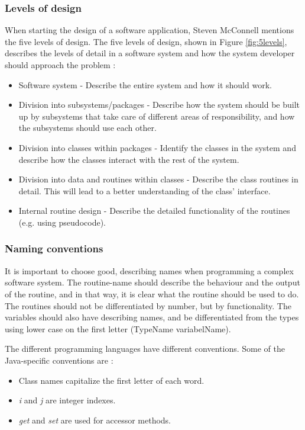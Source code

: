\subsubsection{Levels of design}
\label{sec:levdes}
When starting the design of a software application, Steven McConnell mentions the five levels of design. The five levels of design, shown in Figure \ref{fig:5levels}, describes the levels of detail in a software system and how the system developer should approach the problem \cite{stevemcconnell2004}:
\begin{itemize}
    \item Software system - Describe the entire system and how it should work.
    \item Division into subsystems/packages - Describe how the system should be built up by subsystems that take care of different areas of responsibility, and how the subsystems should use each other.
    \item Division into classes within packages - Identify the classes in the system and describe how the classes interact with the rest of the system.
    \item Division into data and routines within classes - Describe the class routines in detail. This will lead to a better understanding of the class' interface.
    \item Internal routine design - Describe the detailed functionality of the routines (e.g. using pseudocode).
\end{itemize}

\subsubsection{Naming conventions}
\label{sec:nameconv}
It is important to choose good, describing names when programming a complex software system. The routine-name should describe the behaviour and the output of the routine, and in that way, it is clear what the routine should be used to do. The routines should not be differentiated by number, but by functionality. The variables should also have describing names, and be differentiated from the types using lower case on the first letter (TypeName variabelName).

The different programming languages have different conventions. Some of the Java-specific conventions are \cite{stevemcconnell2004}:
\begin{itemize}
    \item Class names capitalize the first letter of each word.
    \item \textit{i} and \textit{j} are integer indexes.
    \item \textit{get} and \textit{set} are used for accessor methods.
\end{itemize}
